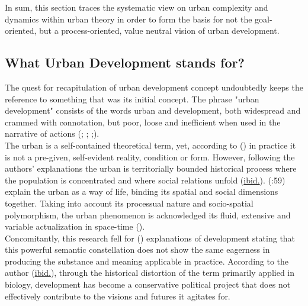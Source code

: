 \documentclass[11pt]{report}
\begin{document}
In sum, this section traces the systematic view on urban complexity and dynamics within urban theory in order to form the basis for not the goal-oriented, but a process-oriented, value neutral vision of urban development.

\subsection{What Urban Development stands for?}

The quest for recapitulation of urban development concept undoubtedly keeps the reference to something that was its initial concept.
The phrase "urban development" consists of the words urban and development, both widespread and crammed with connotation, but poor, loose and inefficient when used in the narrative of actions (\href{Bolay}{\citealt{bolay_slums_2006}}; \href{Bolay}{\citealt{bolay_changements_2010}}; \href{Bolay}{\citealt{bolay_what_2012}};\href{Bolay}{\citealt{bolay_technology_2011}}).
\\

The urban is a self-contained theoretical term, yet, according to (\href{Brenner}{\citealt{brenner_urban_2014}}) in practice it is not a pre-given, self-evident reality, condition or form. 
However, following the authors' explanations the urban is territorially bounded historical process where the population is concentrated and where social relations unfold (\href{Brenner}{ibid.}).
(\href{Soja}{\cite{burdett_urbanization_2006}}:59) explain the urban as a way of life, binding its spatial and social dimensions together.
Taking into account its processual nature and socio-spatial polymorphism, the urban phenomenon is acknowledged its fluid, extensive and variable actualization in space-time (\href{Brenner}{\citealt{brenner_urban_2014}}).
\\

Concomitantly, this research fell for (\href{Esteva}{\citealt{esteva_development_2010}}) explanations of development stating that this powerful semantic constellation does not show the same eagerness in producing the substance and meaning applicable in practice.
According to the author (\href{Esteva}{ibid.}), through the historical distortion of the term primarily applied in biology, development has become a conservative political project that does not effectively contribute to the visions and futures it agitates for. 
\\
\end{document}
